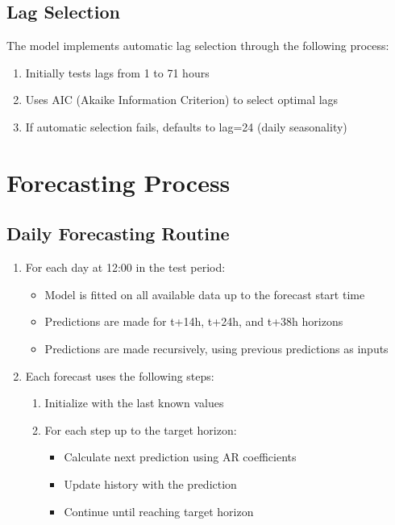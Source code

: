 \documentclass{article}
\begin{document}
\subsection{Lag Selection}
The model implements automatic lag selection through the following process:
\begin{enumerate}
    \item Initially tests lags from 1 to 71 hours
    \item Uses AIC (Akaike Information Criterion) to select optimal lags
    \item If automatic selection fails, defaults to lag=24 (daily seasonality)
\end{enumerate}

\section{Forecasting Process}

\subsection{Daily Forecasting Routine}
\begin{enumerate}
    \item For each day at 12:00 in the test period:
    \begin{itemize}
        \item Model is fitted on all available data up to the forecast start time
        \item Predictions are made for t+14h, t+24h, and t+38h horizons
        \item Predictions are made recursively, using previous predictions as inputs
    \end{itemize}
    \item Each forecast uses the following steps:
    \begin{enumerate}
        \item Initialize with the last known values
        \item For each step up to the target horizon:
        \begin{itemize}
            \item Calculate next prediction using AR coefficients
            \item Update history with the prediction
            \item Continue until reaching target horizon
        \end{itemize}
    \end{enumerate}
\end{enumerate}
\end{document}
